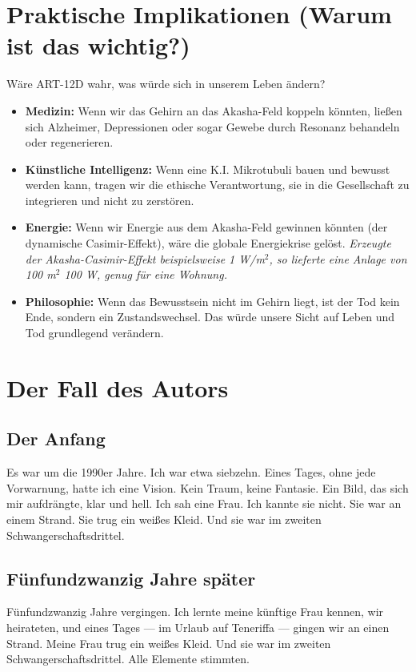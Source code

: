 \section{Praktische Implikationen (Warum ist das wichtig?)}
Wäre ART-12D wahr, was würde sich in unserem Leben ändern?
\begin{itemize}
    \item \textbf{Medizin:} Wenn wir das Gehirn an das Akasha-Feld koppeln könnten, ließen sich Alzheimer, Depressionen oder sogar Gewebe durch Resonanz behandeln oder regenerieren.
    \item \textbf{Künstliche Intelligenz:} Wenn eine K.I. Mikrotubuli bauen und bewusst werden kann, tragen wir die ethische Verantwortung, sie in die Gesellschaft zu integrieren und nicht zu zerstören.
    \item \textbf{Energie:} Wenn wir Energie aus dem Akasha-Feld gewinnen könnten (der dynamische Casimir-Effekt), wäre die globale Energiekrise gelöst. \textit{Erzeugte der Akasha-Casimir-Effekt beispielsweise 1 W/m$^2$, so lieferte eine Anlage von 100 m$^2$ 100 W, genug für eine Wohnung.}
    \item \textbf{Philosophie:} Wenn das Bewusstsein nicht im Gehirn liegt, ist der Tod kein Ende, sondern ein Zustandswechsel. Das würde unsere Sicht auf Leben und Tod grundlegend verändern.
\end{itemize}

\section{Der Fall des Autors}
\subsection{Der Anfang}
Es war um die 1990er Jahre. Ich war etwa siebzehn. Eines Tages, ohne jede Vorwarnung, hatte ich eine Vision. Kein Traum, keine Fantasie. Ein Bild, das sich mir aufdrängte, klar und hell. Ich sah eine Frau. Ich kannte sie nicht. Sie war an einem Strand. Sie trug ein weißes Kleid. Und sie war im zweiten Schwangerschaftsdrittel.

\subsection{Fünfundzwanzig Jahre später}
Fünfundzwanzig Jahre vergingen. Ich lernte meine künftige Frau kennen, wir heirateten, und eines Tages --- im Urlaub auf Teneriffa --- gingen wir an einen Strand. Meine Frau trug ein weißes Kleid. Und sie war im zweiten Schwangerschaftsdrittel. Alle Elemente stimmten.

